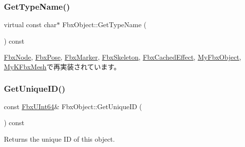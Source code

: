\mbox{\label{class_fbx_object_a817dcfa8f7f7e2437324e1e71377c4b2}} 
\subsubsection{\texorpdfstring{Get\+Type\+Name()}{GetTypeName()}}
{\footnotesize\ttfamily virtual const char$\ast$ Fbx\+Object\+::\+Get\+Type\+Name (\begin{DoxyParamCaption}{ }\end{DoxyParamCaption}) const\hspace{0.3cm}{\ttfamily [virtual]}}



\hyperlink{class_fbx_node_a802220645ef4d155755ebbf6f746a15c}{Fbx\+Node}, \hyperlink{class_fbx_pose_ade93c02bcfa5b5694a6945175387d285}{Fbx\+Pose}, \hyperlink{class_fbx_marker_a8418dc0f13a8197949a412604787c60d}{Fbx\+Marker}, \hyperlink{class_fbx_skeleton_a95bceb7989084e51a450525b4f57698b}{Fbx\+Skeleton}, \hyperlink{class_fbx_cached_effect_a895c62dc90594a2df7d9392632b626a6}{Fbx\+Cached\+Effect}, \hyperlink{class_my_fbx_object_a83fae0bd93495a1cf431c00fbdf8be28}{My\+Fbx\+Object}, \hyperlink{class_my_k_fbx_mesh_a12507f999188a123a733b372ae5c0cf5}{My\+K\+Fbx\+Mesh}で再実装されています。

\mbox{\label{class_fbx_object_a30e02c36e4adf5e42499c1f39ebfae08}} 
\subsubsection{\texorpdfstring{Get\+Unique\+I\+D()}{GetUniqueID()}}
{\footnotesize\ttfamily const \hyperlink{fbxtypes_8h_a9beeca85cdc9941e912fe9eac7709b53}{Fbx\+U\+Int64}\& Fbx\+Object\+::\+Get\+Unique\+ID (\begin{DoxyParamCaption}{ }\end{DoxyParamCaption}) const}



Returns the unique ID of this object. 

\mbox{\label{class_fbx_object_acce60f1ae8d6b0ffba2de85c04766194}} 
